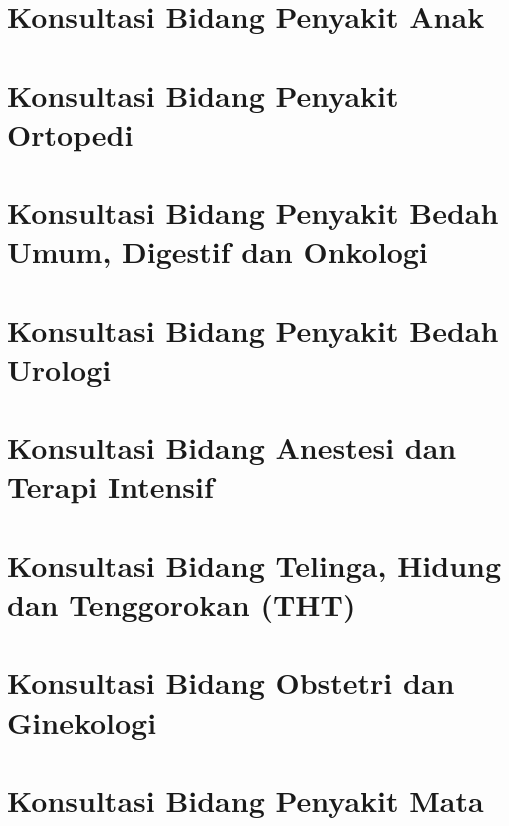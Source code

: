 \documentclass[
]{book}
\begin{document}
\hypertarget{konsultasi-bidang-penyakit-anak}{%
\section{Konsultasi Bidang Penyakit Anak}\label{konsultasi-bidang-penyakit-anak}}

\hypertarget{konsultasi-bidang-penyakit-ortopedi}{%
\section{Konsultasi Bidang Penyakit Ortopedi}\label{konsultasi-bidang-penyakit-ortopedi}}

\hypertarget{konsultasi-bidang-penyakit-bedah-umum-digestif-dan-onkologi}{%
\section{Konsultasi Bidang Penyakit Bedah Umum, Digestif dan Onkologi}\label{konsultasi-bidang-penyakit-bedah-umum-digestif-dan-onkologi}}

\hypertarget{konsultasi-bidang-penyakit-bedah-urologi}{%
\section{Konsultasi Bidang Penyakit Bedah Urologi}\label{konsultasi-bidang-penyakit-bedah-urologi}}

\hypertarget{konsultasi-bidang-anestesi-dan-terapi-intensif}{%
\section{Konsultasi Bidang Anestesi dan Terapi Intensif}\label{konsultasi-bidang-anestesi-dan-terapi-intensif}}

\hypertarget{konsultasi-bidang-telinga-hidung-dan-tenggorokan-tht}{%
\section{Konsultasi Bidang Telinga, Hidung dan Tenggorokan (THT)}\label{konsultasi-bidang-telinga-hidung-dan-tenggorokan-tht}}

\hypertarget{konsultasi-bidang-obstetri-dan-ginekologi}{%
\section{Konsultasi Bidang Obstetri dan Ginekologi}\label{konsultasi-bidang-obstetri-dan-ginekologi}}

\hypertarget{konsultasi-bidang-penyakit-mata}{%
\section{Konsultasi Bidang Penyakit Mata}\label{konsultasi-bidang-penyakit-mata}}
\end{document}
